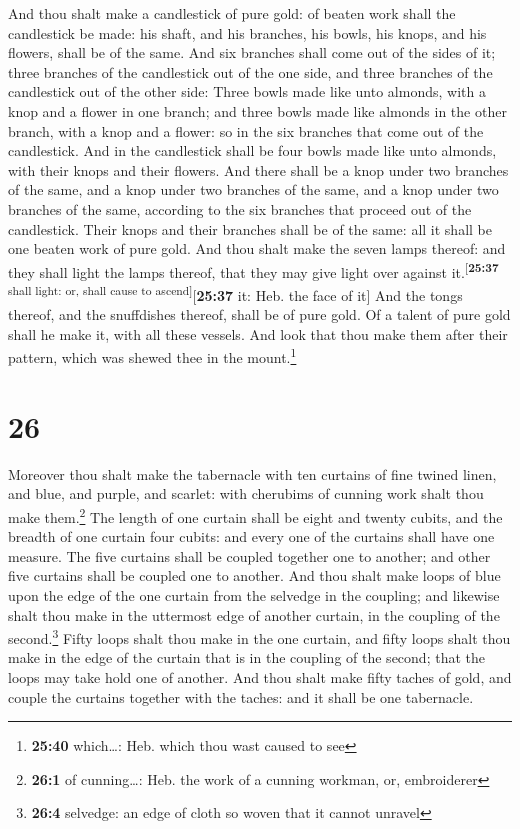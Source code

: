  And thou shalt make a candlestick of pure gold: of
beaten work shall the candlestick be made: his shaft, and his branches,
his bowls, his knops, and his flowers, shall be of the same.
 And six branches shall come out of the sides of it;
three branches of the candlestick out of the one side, and three
branches of the candlestick out of the other side:  Three
bowls made like unto almonds, with a knop and a flower in one branch;
and three bowls made like almonds in the other branch, with a knop and a
flower: so in the six branches that come out of the candlestick.
 And in the candlestick shall be four bowls made like
unto almonds, with their knops and their flowers.  And
there shall be a knop under two branches of the same, and a knop under
two branches of the same, and a knop under two branches of the same,
according to the six branches that proceed out of the candlestick.
 Their knops and their branches shall be of the same: all
it shall be one beaten work of pure gold.  And thou shalt
make the seven lamps thereof: and they shall light the lamps thereof,
that they may give light over against
it.\textsuperscript{{[}\textbf{25:37} shall light: or, shall cause to
ascend{]}}{[}\textbf{25:37} it: Heb. the face of it{]} 
And the tongs thereof, and the snuffdishes thereof, shall be of pure
gold.  Of a talent of pure gold shall he make it, with
all these vessels.  And look that thou make them after
their pattern, which was shewed thee in the mount.\footnote{\textbf{25:40}
  which\ldots: Heb. which thou wast caused to see}

\hypertarget{section-25}{%
\section{26}\label{section-25}}

 Moreover thou shalt make the tabernacle with ten curtains
of fine twined linen, and blue, and purple, and scarlet: with cherubims
of cunning work shalt thou make them.\footnote{\textbf{26:1} of
  cunning\ldots: Heb. the work of a cunning workman, or, embroiderer}
 The length of one curtain shall be eight and twenty
cubits, and the breadth of one curtain four cubits: and every one of the
curtains shall have one measure.  The five curtains shall
be coupled together one to another; and other five curtains shall be
coupled one to another.  And thou shalt make loops of blue
upon the edge of the one curtain from the selvedge in the coupling; and
likewise shalt thou make in the uttermost edge of another curtain, in
the coupling of the second.\footnote{\textbf{26:4} selvedge: an edge of
  cloth so woven that it cannot unravel}  Fifty loops
shalt thou make in the one curtain, and fifty loops shalt thou make in
the edge of the curtain that is in the coupling of the second; that the
loops may take hold one of another.  And thou shalt make
fifty taches of gold, and couple the curtains together with the taches:
and it shall be one tabernacle.

